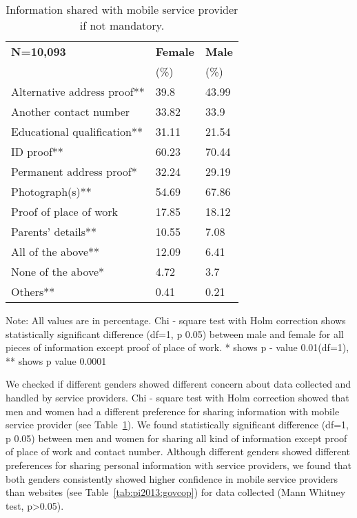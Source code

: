 \begin{table}[!hb]
\vspace{-8mm}
 \centering
 \small
\caption{\small{Information shared with mobile service provider if not mandatory.}}
\setlength{\extrarowheight}{2pt}
\begin{tabular}{p{4cm}p{1.5cm}p{1cm}}
\midrule
\midrule
\bf{N=10,093}& \bf{Female} & \bf{Male}\\
&(\%)&(\%)\\
\midrule
 \rowcolor {gray!15 }
\raggedright Alternative address proof** & 39.8 & 43.99\\
\raggedright Another contact number & 33.82& 33.9\\
\rowcolor {gray!15 }
\raggedright Educational qualification** & 31.11& 21.54\\
\raggedright ID proof** & 60.23& 70.44\\
\rowcolor {gray!15 }
\raggedright Permanent address proof* & 32.24& 29.19\\
\raggedright Photograph(s)**& 54.69& 67.86\\
\rowcolor {gray!15 }
\raggedright Proof of place of work & 17.85& 18.12\\
\raggedright Parents' details**& 10.55& 7.08\\
\rowcolor {gray!15 }
\raggedright All of the above**& 12.09& 6.41\\
\raggedright None of the above*& 4.72& 3.7\\
\rowcolor {gray!15 }
\raggedright Others** & 0.41&0.21\\
\midrule
\midrule
\end{tabular}
\begin{tablenotes}
 \item{Note: All values are in percentage. Chi - square test with Holm correction shows statistically significant difference (df=1, p  0.05) between male and female for all pieces of information except proof of place of work. * shows  p - value  0.01(df=1), ** shows p value   0.0001}
  \end{tablenotes}
\vspace{-4mm}
\label{table:ans4}
\end{table}


We checked if different genders showed different concern about data collected and handled by service providers. Chi - square test with Holm correction showed that men and women had a different preference for sharing information with mobile service provider (see Table~\ref{table:ans4}). We found statistically significant difference (df=1, p  0.05) between men and women for sharing all kind of information except proof of place of work and contact number. Although different genders showed different preferences for sharing personal information with service providers, we found that both genders consistently showed higher confidence in mobile service providers than websites (see Table~\ref{tab:pi2013:govcop}) for data collected (Mann Whitney test,  p>0.05). 



